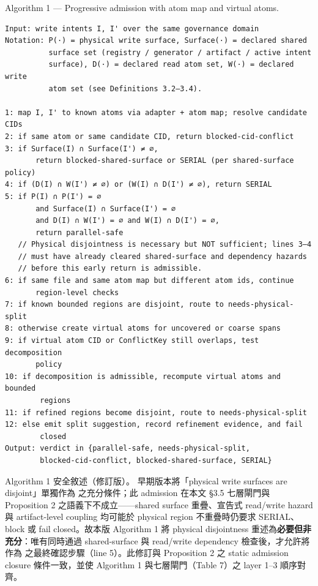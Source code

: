 \documentclass[a4paper,fontset=none]{ctexart}
\begin{document}
Algorithm 1 --- Progressive admission with atom map and virtual atoms.

\begin{Verbatim}[breaklines=true,fontsize=\footnotesize]
Input: write intents I, I' over the same governance domain
Notation: P(·) = physical write surface, Surface(·) = declared shared
          surface set (registry / generator / artifact / active intent
          surface), D(·) = declared read atom set, W(·) = declared write
          atom set (see Definitions 3.2–3.4).

1: map I, I' to known atoms via adapter + atom map; resolve candidate CIDs
2: if same atom or same candidate CID, return blocked-cid-conflict
3: if Surface(I) ∩ Surface(I') ≠ ∅,
       return blocked-shared-surface or SERIAL (per shared-surface policy)
4: if (D(I) ∩ W(I') ≠ ∅) or (W(I) ∩ D(I') ≠ ∅), return SERIAL
5: if P(I) ∩ P(I') = ∅
       and Surface(I) ∩ Surface(I') = ∅
       and D(I) ∩ W(I') = ∅ and W(I) ∩ D(I') = ∅,
       return parallel-safe
   // Physical disjointness is necessary but NOT sufficient; lines 3–4
   // must have already cleared shared-surface and dependency hazards
   // before this early return is admissible.
6: if same file and same atom map but different atom ids, continue
       region-level checks
7: if known bounded regions are disjoint, route to needs-physical-split
8: otherwise create virtual atoms for uncovered or coarse spans
9: if virtual atom CID or ConflictKey still overlaps, test decomposition
       policy
10: if decomposition is admissible, recompute virtual atoms and bounded
        regions
11: if refined regions become disjoint, route to needs-physical-split
12: else emit split suggestion, record refinement evidence, and fail
        closed
Output: verdict in {parallel-safe, needs-physical-split,
        blocked-cid-conflict, blocked-shared-surface, SERIAL}
\end{Verbatim}

Algorithm 1 安全敘述（修訂版）。 早期版本將「physical write surfaces are disjoint」單獨作為 \texttt{} 之充分條件；此 admission 在本文 §3.5 七層閘門與 Proposition 2 之語義下不成立------shared surface 重疊、宣告式 read/write hazard 與 artifact-level coupling 均可能於 physical region 不重疊時仍要求 SERIAL、block 或 fail closed。故本版 Algorithm 1 將 physical disjointness 重述為\textbf{必要但非充分}：唯有同時通過 shared-surface 與 read/write dependency 檢查後，才允許將 \texttt{} 作為 \texttt{} 之最終確認步驟（line 5）。此修訂與 Proposition 2 之 static admission closure 條件一致，並使 Algorithm 1 與七層閘門（Table 7）之 layer 1--3 順序對齊。
\end{document}
